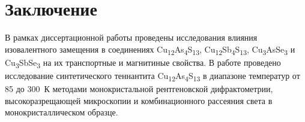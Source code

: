 \chapter*{Заключение}						%



В рамках диссертационной работы проведены исследования влияния изовалентного замещения в соединениях Cu\textsubscript{12}As\textsubscript{4}S\textsubscript{13}, Cu\textsubscript{12}Sb\textsubscript{4}S\textsubscript{13}, Cu\textsubscript{3}AsSe\textsubscript{3} и Cu\textsubscript{3}SbSe\textsubscript{3} на их транспортные и магнитиные свойства. 
В работе проведено исследование  синтетического теннантита Cu\textsubscript{12}As\textsubscript{4}S\textsubscript{13} в диапазоне температур от 85 до 300~К методами монокристальной рентгеновской дифрактометрии, высокоразрещающей микроскопии и комбинационного рассеяния света в монокристаллическом образце.

